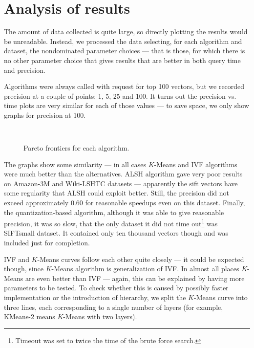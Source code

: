 \section{Analysis of results}

The amount of data collected is quite large, so directly plotting the results would be
unreadable. Instead, we processed the data selecting, for each algorithm and dataset,
the nondominated parameter choices --- that is those, for which there is no other
parameter choice that gives results that are better in both query time and precision.

Algorithms were always called with request for top 100 vectors, but we recorded
precision at a couple of points: 1, 5, 25 and 100. It turns out the precision vs. time
plots are very similar for each of those values --- to save space, we only show
graphs for precision at 100.

\begin{figure}
	\centering
	\\
\caption{Pareto frontiers for each algorithm. }
\end{figure}

The graphs show some similarity --- in all cases  $K$-Means and IVF algorithms were much better
than the alternatives. ALSH algorithm gave very poor results on Amazon-3M and Wiki-LSHTC
datasets --- apparently the sift vectors have some regularity that ALSH could exploit better.
Still, the precision did not exceed approximately $0.60$ for reasonable speedups even on
this dataset. Finally, the quantization-based algorithm, although it was able to give
reasonable precision, it was so slow, that the only dataset it did not time 
out\footnote{Timeout was set to twice the time of the brute force search.}
was SIFTsmall dataset. It contained only ten thousand vectors though and was included
just for completion.

IVF and  $K$-Means curves follow each other quite closely --- it could be expected though,
since  $K$-Means algorithm is generalization of IVF. In almost all places  $K$-Means are even
better than IVF --- again, this can be explained by having more parameters to be tested.
To check whether this is caused by possibly faster implementation or the introduction of
hierarchy, we split the  $K$-Means curve into three lines, each corresponding to a single
number of layers (for example, KMeans-2 means $K$-Means with two layers).

